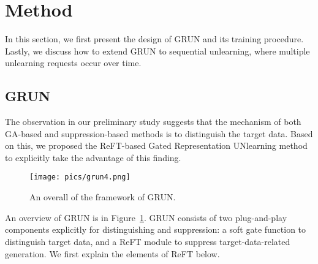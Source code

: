 \section{Method}
\label{sec:method}


In this section, we first present the design of GRUN and its training procedure. Lastly, we discuss how to extend GRUN to sequential unlearning, where multiple unlearning requests occur over time.

\subsection{GRUN}

{The observation in our preliminary study suggests that the mechanism of both GA-based and suppression-based methods is to distinguish the target data. Based on this, we proposed the ReFT-based Gated Representation UNlearning method to explicitly take the advantage of this finding.} 

\begin{figure}[t]
\centering
  \texttt{[image: pics/grun4.png]}
  \caption{An overall of the framework of GRUN. }
  \label{fig:grun}
  \vspace{-0.1in}
\end{figure}


An overview of GRUN is in Figure~\ref{fig:grun}. GRUN consists of two plug-and-play components explicitly for distinguishing and suppression: a soft gate function to distinguish target data, and a ReFT module to suppress target-data-related generation. 
We first explain the elements of ReFT below.

